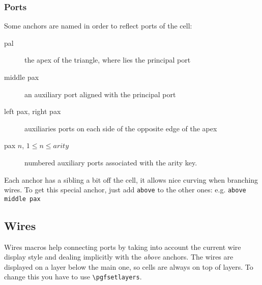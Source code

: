\documentclass[10pt,a4paper]{article}
\begin{document}
\subsubsection{Ports}
Some anchors are named in order to reflect ports of the cell:
\begin{description}
    \item[pal] the apex of the triangle, where lies the principal port
    \item[middle pax] an auxiliary port aligned with the principal port
    \item[left pax, right pax] auxiliaries ports on each side of the opposite
        edge of the apex
    \item[pax $n$, $1 \le n \le arity$] numbered auxiliary ports associated
        with the arity key.
\end{description}

Each anchor has a sibling a bit off the cell, it allows nice curving when
branching wires. To get this special anchor, just add \verb+above+ to the 
other ones: e.g. \verb+above middle pax+

\begin{center}
\end{center}

\subsection{Wires}
Wires macros help connecting ports by taking into account the current
wire display style and dealing implicitly with the \emph{above} anchors.
The wires are displayed on a layer below the main one, so cells are always
on top of layers. To change this you have to use \verb+\pgfsetlayers+.
\end{document}
